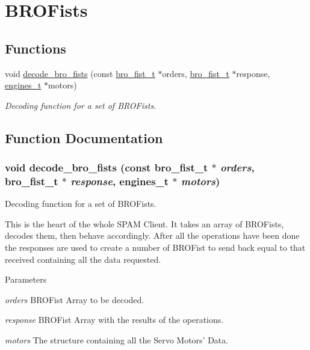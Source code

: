 \hypertarget{group___b_r_o_fists}{
\section{BROFists}
\label{group___b_r_o_fists}
}
\subsection*{Functions}
\begin{DoxyCompactItemize}
\item 
void \hyperlink{group___b_r_o_fists_gae0a1fa9c2e435b1ecf7c2d43e48d8326}{decode\_\-bro\_\-fists} (const \hyperlink{structbro__fist__t}{bro\_\-fist\_\-t} $\ast$orders, \hyperlink{structbro__fist__t}{bro\_\-fist\_\-t} $\ast$response, \hyperlink{structengines__t}{engines\_\-t} $\ast$motors)
\begin{DoxyCompactList}\small\item\em Decoding function for a set of BROFists. \item\end{DoxyCompactList}\end{DoxyCompactItemize}


\subsection{Function Documentation}
\hypertarget{group___b_r_o_fists_gae0a1fa9c2e435b1ecf7c2d43e48d8326}{
\subsubsection[{decode\_\-bro\_\-fists}]{\setlength{\rightskip}{0pt plus 5cm}void decode\_\-bro\_\-fists (const {\bf bro\_\-fist\_\-t} $\ast$ {\em orders}, \/  {\bf bro\_\-fist\_\-t} $\ast$ {\em response}, \/  {\bf engines\_\-t} $\ast$ {\em motors})}}
\label{group___b_r_o_fists_gae0a1fa9c2e435b1ecf7c2d43e48d8326}


Decoding function for a set of BROFists. 

This is the heart of the whole SPAM Client. It takes an array of BROFists, decodes them, then behave accordingly. After all the operations have been done the responses are used to create a number of BROFist to send back equal to that received containing all the data requested.


\begin{DoxyParams}{Parameters}
\item[{\em orders}]BROFist Array to be decoded. \item[{\em response}]BROFist Array with the results of the operations. \item[{\em motors}]The structure containing all the Servo Motors' Data. \end{DoxyParams}
